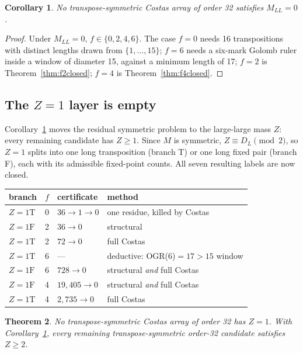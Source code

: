 \documentclass[11pt,a4paper]{article}
\newtheorem{theorem}{Theorem}[section]
\newtheorem{corollary}[theorem]{Corollary}
\theoremstyle{definition}
\begin{document}
\begin{corollary}
\label{cor:mll0}
No transpose-symmetric Costas array of order 32 satisfies $M_{LL}=0$.
\end{corollary}
\begin{proof}
Under $M_{LL}=0$, $f\in\{0,2,4,6\}$. The case $f=0$ needs 16 transpositions with
distinct lengths drawn from $\{1,\dots,15\}$; $f=6$ needs a six-mark Golomb ruler
inside a window of diameter 15, against a minimum length of 17; $f=2$ is
Theorem~\ref{thm:f2closed}; $f=4$ is Theorem~\ref{thm:f4closed}.
\end{proof}

\subsection{The $Z=1$ layer is empty}
\label{sec:z1cells}

Corollary~\ref{cor:mll0} moves the residual symmetric problem to the large-large
mass $Z$: every remaining candidate has $Z\ge1$. Since $M$ is symmetric,
$Z\equiv D_L\pmod 2$, so $Z=1$ splits into one long transposition (branch T) or
one long fixed pair (branch F), each with its admissible fixed-point counts.
All seven resulting labels are now closed.

\begin{center}
\begin{tabular}{@{}llll@{}}
\toprule
branch & $f$ & certificate & method \\
\midrule
$Z{=}1\mathrm T$ & 0 & $36\to1\to0$ & one residue, killed by Costas \\
$Z{=}1\mathrm F$ & 2 & $36\to0$ & structural \\
$Z{=}1\mathrm T$ & 2 & $72\to0$ & full Costas \\
$Z{=}1\mathrm T$ & 6 & --- & deductive: OGR(6)$=17>15$ window \\
$Z{=}1\mathrm F$ & 6 & $728\to0$ & structural \emph{and} full Costas \\
$Z{=}1\mathrm F$ & 4 & $19{,}405\to0$ & structural \emph{and} full Costas \\
$Z{=}1\mathrm T$ & 4 & $2{,}735\to0$ & full Costas \\
\bottomrule
\end{tabular}
\end{center}

\begin{theorem}
\label{thm:z1empty}
No transpose-symmetric Costas array of order 32 has $Z=1$. With
Corollary~\ref{cor:mll0}, every remaining transpose-symmetric order-32 candidate
satisfies $Z\ge2$.
\end{theorem}
\end{document}
